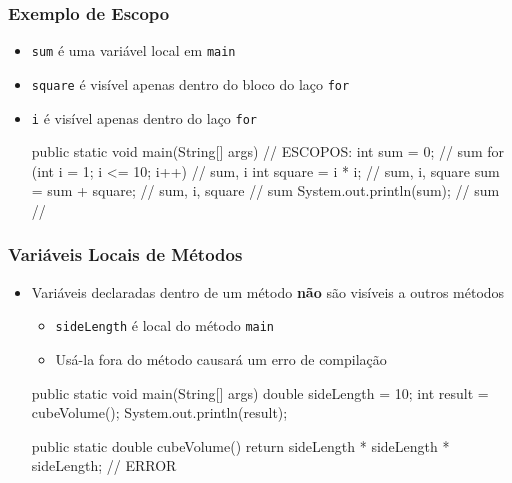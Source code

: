 \documentclass[xcolor={dvipsnames,table},aspectratio=169]{beamer}
\begin{document}
\begin{frame}[fragile]\frametitle{Exemplo de Escopo}
\begin{itemize}
	\item \texttt{sum} é uma variável local em \texttt{main}
	\item \texttt{square} é visível apenas dentro do bloco do laço \texttt{for}
	\item \texttt{i} é visível apenas dentro do laço \texttt{for}
\begin{javacode}
public static void main(String[] args) { // ESCOPOS:
  int sum = 0;                           // sum
  for (int i = 1; i <= 10; i++)  {       // sum, i
    int square = i * i;                  // sum, i, square
    sum = sum + square;                  // sum, i, square
  }                                      // sum
  System.out.println(sum);               // sum
}                                        //
\end{javacode}
\end{itemize}
\end{frame}

\begin{frame}[fragile]\frametitle{Variáveis Locais de Métodos}
\begin{itemize}
	\item Variáveis declaradas dentro de um método \textbf{não} são visíveis a outros métodos
	\begin{itemize}
		\item \texttt{sideLength} é local do método \texttt{main}
		\item Usá-la fora do método causará um erro de compilação
	\end{itemize}
\begin{javacode}
public static void main(String[] args) {
  double sideLength = 10;
  int result = cubeVolume();
  System.out.println(result);
}

public static double cubeVolume() {
  return sideLength * sideLength * sideLength; // ERROR
}
\end{javacode}
\end{itemize}
\end{frame}
\end{document}
